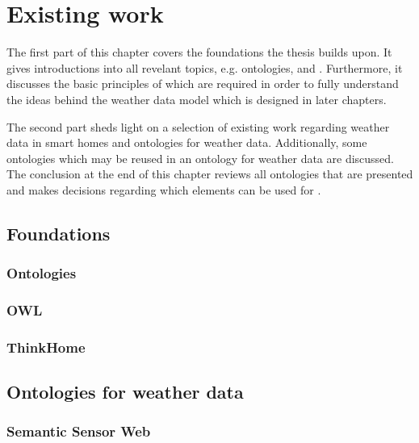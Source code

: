 \chapter{Existing work}
\label{ch:existing_work}

The first part of this chapter covers the foundations the thesis builds upon. It gives introductions into all revelant topics, e.g. ontologies,  and . Furthermore, it discusses the basic principles of \thinkhome which are required in order to fully understand the ideas behind the weather data model which is designed in later chapters.

The second part sheds light on a selection of existing work regarding weather data in smart homes and ontologies for weather data. Additionally, some ontologies which may be reused in an ontology for weather data are discussed. The conclusion at the end of this chapter reviews all ontologies that are presented and makes decisions regarding which elements can be used for \thinkhome.

\section{Foundations}


\subsection{Ontologies}

\subsection{OWL}

\subsection{ThinkHome}

\section{Ontologies for weather data}


\subsection{Semantic Sensor Web}

